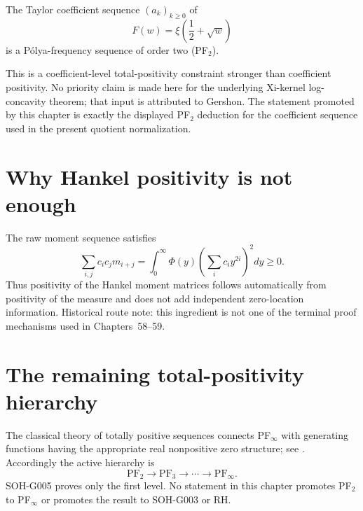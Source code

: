 \begin{theorem}[SOH-G005]
The Taylor coefficient sequence $(a_k)_{k\ge0}$ of
\[
F(w)=\xi\!\left(\frac12+\sqrt w\right)
\]
is a P\'olya-frequency sequence of order two (PF$_2$).
\end{theorem}

This is a coefficient-level total-positivity constraint stronger than coefficient positivity. No priority claim is made here for the underlying Xi-kernel log-concavity theorem; that input is attributed to Gershon. The statement promoted by this chapter is exactly the displayed PF$_2$ deduction for the coefficient sequence used in the present quotient normalization.

\section{Why Hankel positivity is not enough}

The raw moment sequence satisfies
\[
\sum_{i,j}c_ic_jm_{i+j}
=\int_0^\infty\Phi(y)
\left(\sum_i c_i y^{2i}\right)^2dy\ge0.
\]
Thus positivity of the Hankel moment matrices follows automatically from positivity of the measure and does not add independent zero-location information. Historical route note: this ingredient is not one of the terminal proof mechanisms used in Chapters~58--59.

\section{The remaining total-positivity hierarchy}

The classical theory of totally positive sequences connects PF$_\infty$ with generating functions having the appropriate real nonpositive zero structure; see \citet{aissenedreischoenbergwhitney1951}. Accordingly the active hierarchy is
\[
\mathrm{PF}_2
\longrightarrow
\mathrm{PF}_3
\longrightarrow\cdots\longrightarrow
\mathrm{PF}_\infty.
\]
SOH-G005 proves only the first level. No statement in this chapter promotes PF$_2$ to PF$_\infty$ or promotes the result to SOH-G003 or RH.
